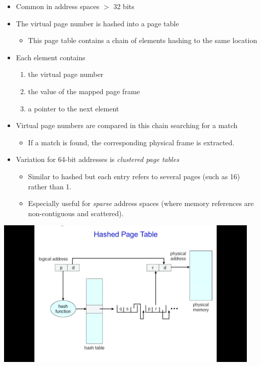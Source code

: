 \documentclass[11pt,a4paper]{article}
\begin{document}
\begin{itemize}
    \item Common in address spaces $>$ 32 bits
    \item The virtual page number is hashed into a page table
        \begin{itemize}
            \item This page table contains a chain of elements hashing to the same location
        \end{itemize}
    \item Each element contains
        \begin{enumerate}
            \item the virtual page number
            \item the value of the mapped page frame
            \item a pointer to the next element
        \end{enumerate}
    \item Virtual page numbers are compared in this chain searching for a match
        \begin{itemize}
            \item If a match is found, the corresponding physical frame is extracted.
        \end{itemize}
    \item Variation for 64-bit addresses is \emph{clustered page tables}
        \begin{itemize}
            \item Similar to hashed but each entry refers to several pages (such as 16)
                rather than 1.
            \item Especially useful for \emph{sparse} address spaces (where memory references
                are non-contiguous and scattered).
        \end{itemize}
\end{itemize}

\includegraphics[height=270]{hashed-page-table.jpg}
\end{document}
